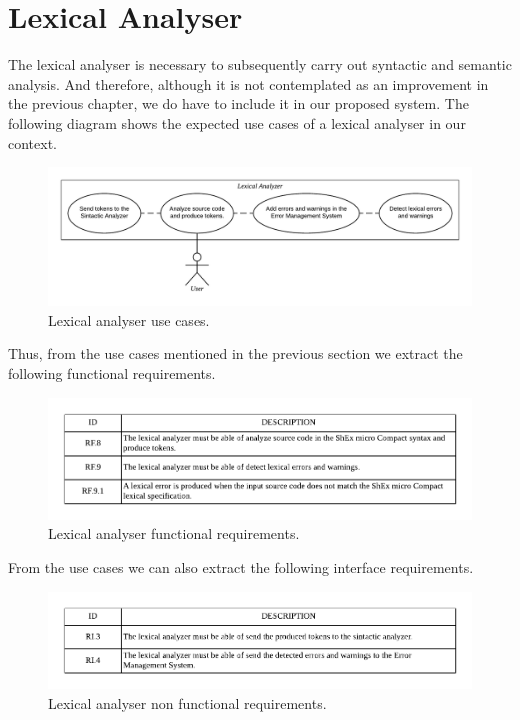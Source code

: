\section{Lexical Analyser}
The lexical analyser is necessary to subsequently carry out syntactic and semantic analysis.
And therefore, although it is not contemplated as an improvement in
the previous chapter, we do have to include it in our proposed system. The following diagram
shows the expected use cases of a lexical analyser in our context.

\begin{figure}[h!]
    \includegraphics[scale=0.6]{images/lex-use-case.pdf}
    \centering
    \caption[Lexical analyser use cases]{Lexical analyser use cases.}
    \label{fig:lex-use-case}
\end{figure}

Thus, from the use cases mentioned in the previous section we
extract the following functional requirements.

\begin{figure}[h!]
    \includegraphics[width=\textwidth]{images/lex-reqf.pdf}
    \centering
    \caption[Lexical analyser functional requirements]{Lexical analyser functional requirements.}
    \label{fig:lex-reqf}
\end{figure}

From the use cases we can also extract the following interface requirements.

\begin{figure}[h!]
    \includegraphics[width=\textwidth]{images/lex-reqnf.pdf}
    \centering
    \caption[Lexical analyser non functional requirements]{Lexical analyser non functional requirements.}
    \label{fig:lex-reqnf}
\end{figure}

